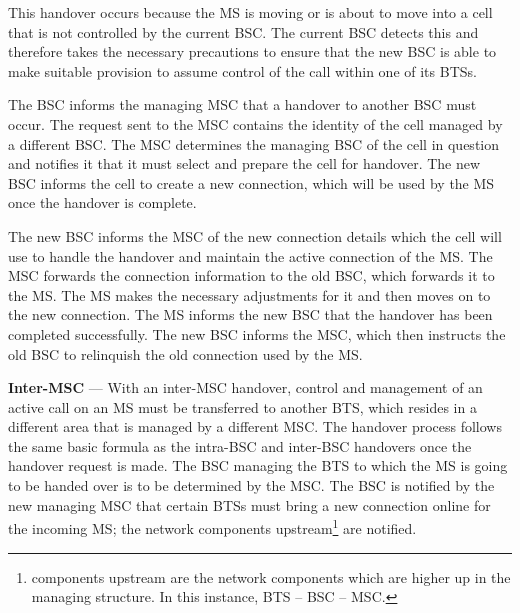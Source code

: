 \begin{description}
  This handover occurs because the \gls{MS} is moving or is about to move into a cell that is not controlled by the current \gls{BSC}\@. The current \gls{BSC} detects this and therefore takes the necessary precautions to ensure that the new \gls{BSC} is able to make suitable provision to assume control of the call within one of its BTSs\cite{wirelesstelcoMullet,GSMArchitectureProtocolsServices}.

The \gls{BSC} informs the managing \gls{MSC} that a handover to another \gls{BSC} must occur. The request sent to the \gls{MSC} contains the identity of the cell managed by a different BSC\@. The \gls{MSC} determines the managing \gls{BSC} of the cell in question and notifies it that it must select and prepare the cell for handover. The new \gls{BSC} informs the cell to create a new connection, which will be used by the \gls{MS} once the handover is complete\cite{wirelesstelcoMullet,GSMArchitectureProtocolsServices}.

The new \gls{BSC} informs the \gls{MSC} of the new connection details which the cell will use to handle the handover and maintain the active connection of the \gls{MS}\@\cite{wirelesstelcoMullet}. The \gls{MSC} forwards the connection information to the old \gls{BSC}, which forwards it to the \gls{MS}\@\cite{wirelesstelcoMullet}. The \gls{MS} makes the necessary adjustments for it and then moves on to the new connection. The \gls{MS} informs the new \gls{BSC} that the handover has been completed successfully\cite{wirelesstelcoMullet}. The new \gls{BSC} informs the \gls{MSC}, which then instructs the old \gls{BSC} to relinquish the old connection used by the \gls{MS}\cite{wirelesstelcoMullet,GSMArchitectureProtocolsServices}.
\item{\textbf{Inter-MSC}} --- With an inter-\gls{MSC} handover, control and management of an active call on an \gls{MS} must be transferred to another \gls{BTS}, which resides in a different area that is managed by a different MSC\@\cite{wirelesstelcoMullet}. The handover process follows the same basic formula as the intra-\gls{BSC} and inter-\gls{BSC} handovers once the handover request is made\cite{wirelesstelcoMullet,GSMArchitectureProtocolsServices}.
The \gls{BSC} managing the \gls{BTS} to which the \gls{MS} is going to be handed over is to be determined by the MSC\@\cite{wirelesstelcoMullet}. The \gls{BSC} is notified by the new managing \gls{MSC} that certain \glspl{BTS} must bring a new connection online for the incoming \gls{MS}; the network components upstream\footnote{components upstream are the network components which are higher up in the managing structure. In this instance, \gls{BTS} -- \gls{BSC} -- \gls{MSC}\@.} are notified\cite{wirelesstelcoMullet,GSMArchitectureProtocolsServices}.


\end{description}

